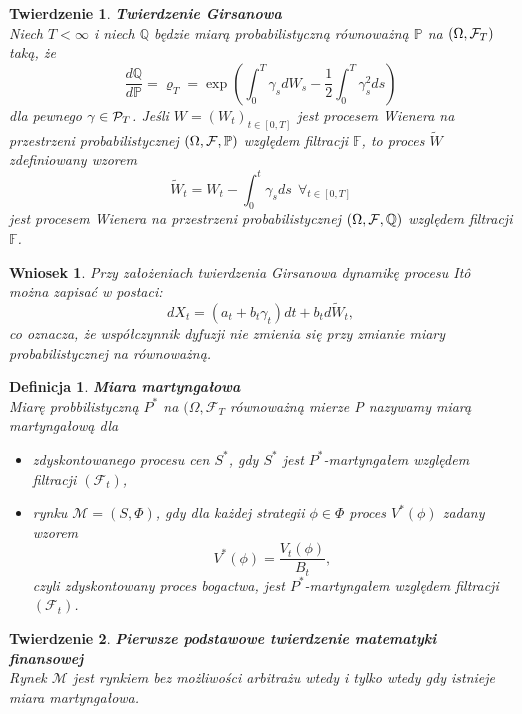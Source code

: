 \documentclass{mini}
\theoremstyle{mythstyle}
\newtheorem{Twierdzenie}{Twierdzenie}[chapter]
\newtheorem{Definicja}{Definicja}[chapter]
\newtheorem{Wniosek}{Wniosek}[chapter]
\begin{document}
\begin{Twierdzenie}\textbf{Twierdzenie Girsanowa}\\
	Niech $T < \infty$ i niech $\mathbb{Q}$ będzie miarą
	probabilistyczną równoważną $\mathbb{P}$ na $(\Omega, {\cal F}_T)$
	taką, że
	\begin{equation*}
	\frac{d \mathbb{Q}}{d \mathbb{P}} = \varrho_T = \exp\left(\int_0^T \gamma_s d
	W_s - \frac{1}{2} \int_0^T \gamma_s^2 ds\right)
	\end{equation*}
	dla pewnego $\gamma \in {\cal P}_T$. Jeśli $W = (W_t)_{t \in [0, T]}$ jest procesem Wienera na przestrzeni probabilistycznej $(\Omega, {\cal F}, \mathbb{P})$ względem filtracji $\mathbb{F}$, to proces $\widetilde{W}$ zdefiniowany wzorem
	\[
	\widetilde{W}_t = W_t - \int_0^t \gamma_s ds \ \ \forall_{t \in [0,
		T]}
	\]
	jest procesem Wienera na przestrzeni probabilistycznej $(\Omega,
	{\cal F}, \mathbb{Q})$ względem filtracji $\mathbb{F}$.\\
\end{Twierdzenie}
\begin{Wniosek}
	Przy założeniach twierdzenia Girsanowa dynamikę procesu It\^{o} można zapisać w postaci:
	$$ dX_t = (a_t+b_t \gamma_t)dt + b_t d\widetilde{W}_t,$$
	co oznacza, że współczynnik dyfuzji nie zmienia się przy zmianie miary probabilistycznej na równoważną.\\
\end{Wniosek}
\begin{Definicja}
	\textbf{Miara martyngałowa}\\
	Miarę probbilistyczną $P^*$ na $(\Omega,\mathcal{F}_T $ równoważną mierze P nazywamy miarą martyngałową dla
	\begin{itemize}
		\item zdyskontowanego procesu cen $S^*$, gdy $S^*$ jest $P^*$-martyngałem względem filtracji $(\mathcal{F}_t)$,
		\item rynku $\mathcal{M}= (S,\Phi)$, gdy dla każdej strategii $\phi \in \Phi$ proces $V^*(\phi)$ zadany wzorem
		\begin{equation*}
		V^*(\phi) = \frac{V_t(\phi)}{B_t},
		\end{equation*}
		czyli zdyskontowany proces bogactwa, jest $P^*$-martyngałem względem filtracji $(\mathcal{F}_t)$.\\
	\end{itemize}
\end{Definicja}
\begin{Twierdzenie}
	\textbf{Pierwsze podstawowe twierdzenie matematyki finansowej}\\
	Rynek $\mathcal{M}$ jest rynkiem bez możliwości arbitrażu wtedy i tylko wtedy gdy istnieje miara martyngałowa.\\
\end{Twierdzenie}
\end{document}
